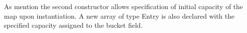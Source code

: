 \documentclass[a4paper]{article}
\begin{document}
As mention the second constructor allows specification of initial capacity of the map upon instantiation.
A new array of type Entry is also declared with the specified capacity assigned to the bucket field. \pagebreak






\end{document}
